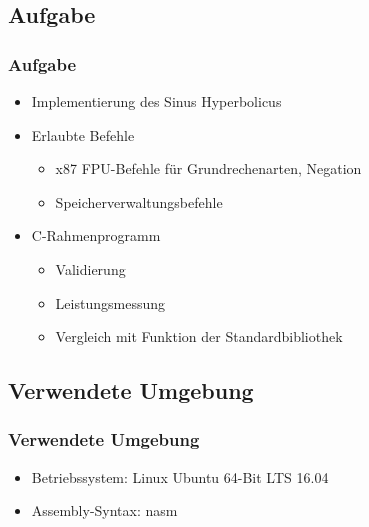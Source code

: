 	
	\frame{\titlepage}
	\begin{frame}
		\tableofcontents
	\end{frame}
	\begin{frame}
		\section{Aufgabe}
		\frametitle{Aufgabe}
		\begin{itemize}
			\item Implementierung des Sinus Hyperbolicus
			\item Erlaubte Befehle
			\begin{itemize}
				\item x87 FPU-Befehle für Grundrechenarten, Negation
				\item Speicherverwaltungsbefehle
			\end{itemize}
			\item C-Rahmenprogramm
			\begin{itemize}
				\item Validierung
				\item Leistungsmessung 
				\item Vergleich mit Funktion der Standardbibliothek
			\end{itemize}
		\end{itemize}
	\end{frame}
	\begin{frame}
		\section{Verwendete Umgebung}
		\frametitle{Verwendete Umgebung}
		\begin{itemize}
			\item Betriebssystem: Linux Ubuntu 64-Bit LTS 16.04
			\item Assembly-Syntax: nasm
		\end{itemize}
	\end{frame}

